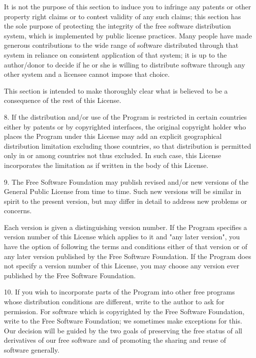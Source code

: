 \documentclass{doc}
\begin{document}
It is not the purpose of this section to induce you to infringe any
patents or other property right claims or to contest validity of any
such claims; this section has the sole purpose of protecting the
integrity of the free software distribution system, which is
implemented by public license practices.  Many people have made
generous contributions to the wide range of software distributed
through that system in reliance on consistent application of that
system; it is up to the author/donor to decide if he or she is willing
to distribute software through any other system and a licensee cannot
impose that choice.

This section is intended to make thoroughly clear what is believed to
be a consequence of the rest of this License.

  8. If the distribution and/or use of the Program is restricted in
certain countries either by patents or by copyrighted interfaces, the
original copyright holder who places the Program under this License
may add an explicit geographical distribution limitation excluding
those countries, so that distribution is permitted only in or among
countries not thus excluded.  In such case, this License incorporates
the limitation as if written in the body of this License.

  9. The Free Software Foundation may publish revised and/or new versions
of the General Public License from time to time.  Such new versions will
be similar in spirit to the present version, but may differ in detail to
address new problems or concerns.

Each version is given a distinguishing version number.  If the Program
specifies a version number of this License which applies to it and "any
later version", you have the option of following the terms and conditions
either of that version or of any later version published by the Free
Software Foundation.  If the Program does not specify a version number of
this License, you may choose any version ever published by the Free Software
Foundation.

  10. If you wish to incorporate parts of the Program into other free
programs whose distribution conditions are different, write to the author
to ask for permission.  For software which is copyrighted by the Free
Software Foundation, write to the Free Software Foundation; we sometimes
make exceptions for this.  Our decision will be guided by the two goals
of preserving the free status of all derivatives of our free software and
of promoting the sharing and reuse of software generally.
\end{document}
